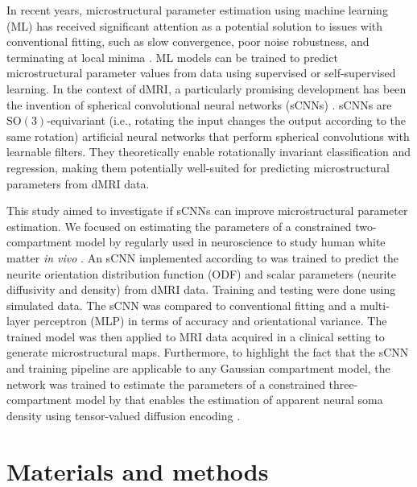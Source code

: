 \documentclass[10pt, letterpaper, oneside]{article}
\begin{document}
In recent years, microstructural parameter estimation using machine learning (ML) has received significant attention as a potential solution to issues with conventional fitting, such as slow convergence, poor noise robustness, and terminating at local minima \citep{golkov2016q, barbieri2020deep, palombo2020sandi, karimi2021deep, gyori2021potential, de2021neural, elaldi2021equivariant, sedlar2021diffusion, sedlar2021spherical, gyori2022training, kerkela2022improved}. ML models can be trained to predict microstructural parameter values from data using supervised or self-supervised learning. In the context of dMRI, a particularly promising development has been the invention of spherical convolutional neural networks (sCNNs) \citep{cohen2018spherical, esteves2018learning}. sCNNs are $\text{SO}(3)$-equivariant (i.e., rotating the input changes the output according to the same rotation) artificial neural networks that perform spherical convolutions with learnable filters. They theoretically enable rotationally invariant classification and regression, making them potentially well-suited for predicting microstructural parameters from dMRI data.

This study aimed to investigate if sCNNs can improve microstructural parameter estimation. We focused on estimating the parameters of a constrained two-compartment model by \cite{kaden2016multi} regularly used in neuroscience to study human white matter \textit{in vivo} \citep{collins2019white, voldsbekk2021sleep, toescu2021tractographic, rahmanzadeh2022new, battocchio2022bundle}. An sCNN implemented according to \cite{esteves2018learning} was trained to predict the neurite orientation distribution function (ODF) and scalar parameters (neurite diffusivity and density) from dMRI data. Training and testing were done using simulated data. The sCNN was compared to conventional fitting and a multi-layer perceptron (MLP) in terms of accuracy and orientational variance. The trained model was then applied to MRI data acquired in a clinical setting to generate microstructural maps. Furthermore, to highlight the fact that the sCNN and training pipeline are applicable to any Gaussian compartment model, the network was trained to estimate the parameters of a constrained three-compartment model by \cite{gyori2021potential} that enables the estimation of apparent neural soma density using tensor-valued diffusion encoding \citep{topgaard2017multidimensional}.

\section{Materials and methods}
\end{document}
